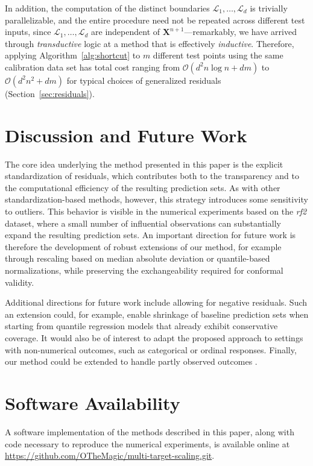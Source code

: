 In addition, the computation of the distinct boundaries $\mathcal{L}_1,\ldots,\mathcal{L}_d$ is trivially parallelizable, and the entire procedure need not be repeated across different test inputs, since $\mathcal{L}_1,\ldots,\mathcal{L}_d$ are independent of $\mathbf{X}^{n+1}$---remarkably, we have arrived through {\em transductive} logic at a method that is effectively {\em inductive}. Therefore, applying Algorithm~\ref{alg:shortcut} to $m$ different test points using the same calibration data set has total cost ranging from $\mathcal{O}(d^2 n \log n + dm)$ to $\mathcal{O}(d^2 n^2 + dm)$ for typical choices of generalized residuals (Section~\ref{sec:residuals}).





\section{Discussion and Future Work}
\label{sec:discussion}

The core idea underlying the method presented in this paper is the explicit standardization of residuals, which contributes both to the transparency and to the computational efficiency of the resulting prediction sets. As with other standardization-based methods, however, this strategy introduces some sensitivity to outliers. This behavior is visible in the numerical experiments based on the \emph{rf2} dataset, where a small number of influential observations can substantially expand the resulting prediction sets. An important direction for future work is therefore the development of robust extensions of our method, for example through rescaling based on median absolute deviation or quantile-based normalizations, while preserving the exchangeability required for conformal validity.

Additional directions for future work include allowing for negative residuals. Such an extension could, for example, enable shrinkage of baseline prediction sets when starting from quantile regression models that already exhibit conservative coverage. It would also be of interest to adapt the proposed approach to settings with non-numerical outcomes, such as categorical or ordinal responses. Finally, our method could be extended to handle partly observed outcomes \citep{braun2025multivariate}.

\section*{Software Availability}

A software implementation of the methods described in this paper, along with code necessary to reproduce the numerical experiments, is available online at \url{https://github.com/OTheMagic/multi-target-scaling.git}.



